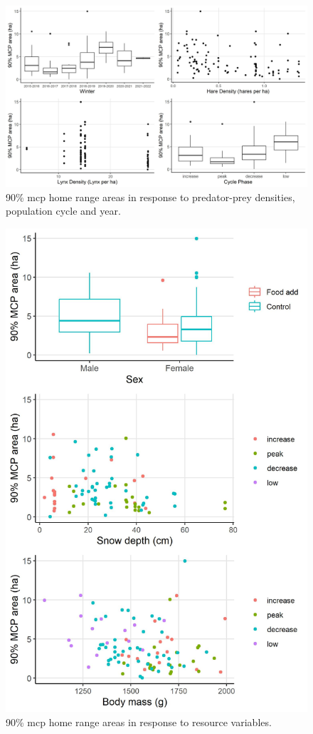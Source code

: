 \documentclass[
]{article}
\begin{document}
\begin{figure}
\centering
\includegraphics{output/figures/HRbycycle.jpeg}
\caption{90\% mcp home range areas in response to predator-prey
densities, population cycle and year.}
\end{figure}

\begin{figure}
\centering
\includegraphics{output/figures/HRbyresource.jpeg}
\caption{90\% mcp home range areas in response to resource variables.}
\end{figure}
\end{document}
